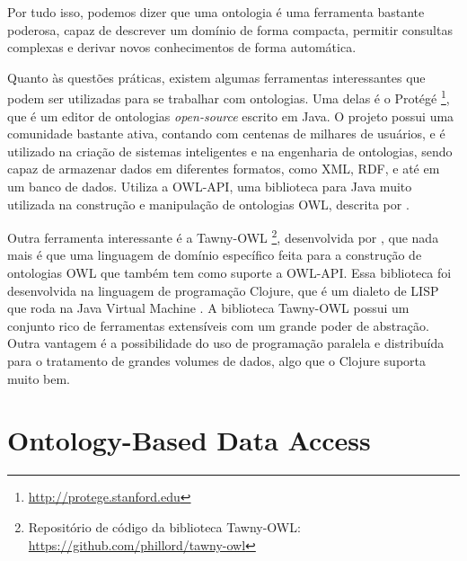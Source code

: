 Por tudo isso, podemos dizer que uma ontologia é uma ferramenta bastante poderosa, capaz de descrever um domínio de forma compacta, permitir consultas complexas e derivar novos conhecimentos de forma automática.

Quanto às questões práticas, existem algumas ferramentas interessantes que
podem ser utilizadas para se trabalhar com ontologias. Uma delas é o Protégé \footnote{\url{http://protege.stanford.edu}},
que é um editor de ontologias \textit{open-source} escrito em Java. O projeto possui uma comunidade bastante ativa, contando com centenas de milhares de usuários, e é utilizado na criação de sistemas inteligentes e na engenharia de ontologias, sendo capaz de armazenar dados em diferentes formatos, como XML, RDF, e até em um banco de dados. Utiliza a OWL-API, uma biblioteca para Java muito utilizada na construção e manipulação de ontologias OWL, descrita por \citet{Horridge:2011:OAJ:2019470.2019471}.

Outra ferramenta interessante é a Tawny-OWL \footnote{Repositório de código da biblioteca Tawny-OWL: \url{https://github.com/phillord/tawny-owl}}, desenvolvida por \citet{DBLP:journals/corr/abs-1303-0213}, que nada mais é que uma linguagem de domínio específico feita para a construção de ontologias OWL que também tem como suporte a OWL-API. Essa biblioteca foi desenvolvida na linguagem de programação Clojure, que é um dialeto de LISP que roda na Java Virtual Machine \citep{hickey2008}. A biblioteca Tawny-OWL possui um conjunto rico de ferramentas extensíveis com um grande poder de abstração. Outra vantagem é a possibilidade do uso de programação paralela e distribuída para o tratamento de grandes volumes de dados, algo que o Clojure suporta muito bem.

\section{Ontology-Based Data Access}
\label{sec:obda}
